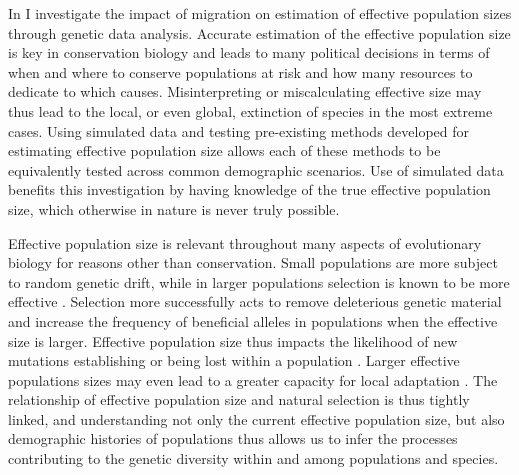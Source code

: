 In  I investigate the impact of migration on estimation of effective population sizes through genetic data analysis. Accurate estimation of the effective population size is key in conservation biology and leads to many political decisions in terms of when and where to conserve populations at risk and how many resources to dedicate to which causes. Misinterpreting or miscalculating effective size may thus lead to the local, or even global, extinction of species in the most extreme cases. Using simulated data and testing pre-existing methods developed for estimating effective population size allows each of these methods to be equivalently tested across common demographic scenarios. Use of simulated data benefits this investigation by having knowledge of the true effective population size, which otherwise in nature is never truly possible.



Effective population size is relevant throughout many aspects of evolutionary biology for reasons other than conservation. Small populations are more subject to random genetic drift, while in larger populations selection is known to be more effective \citep{Wright:1931, Kimura:1964, Gravel:2016}. Selection more successfully acts to remove deleterious genetic material and increase the frequency of beneficial alleles in populations when the effective size is larger. Effective population size thus impacts the likelihood of new mutations establishing or being lost within a population \citep{Kimura:1962, Whitlock:2000}. Larger effective populations sizes may even lead to a greater capacity for local adaptation \citep{Leimu:2008}. The relationship of effective population size and natural selection is thus tightly linked, and understanding not only the current effective population size, but also demographic histories of populations thus allows us to infer the processes contributing to the genetic diversity within and among populations and species.%

